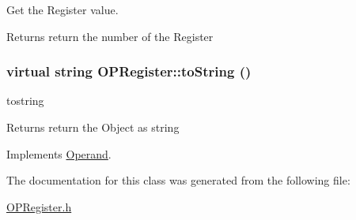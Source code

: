 Get the Register value. \begin{DoxyReturn}{Returns}
return the number of the Register 
\end{DoxyReturn}
\hypertarget{classOPRegister_a233e4744403c78afc8e88e4c804a485f}{
\subsubsection[{toString}]{\setlength{\rightskip}{0pt plus 5cm}virtual string OPRegister::toString ()}}
\label{classOPRegister_a233e4744403c78afc8e88e4c804a485f}


tostring \begin{DoxyReturn}{Returns}
return the Object as string 
\end{DoxyReturn}


Implements \hyperlink{classOperand_aaa9879d6c4fb8334c1b4d97dad614cef}{Operand}.

The documentation for this class was generated from the following file:\begin{DoxyCompactItemize}
\item 
\hyperlink{OPRegister_8h}{OPRegister.h}\end{DoxyCompactItemize}
